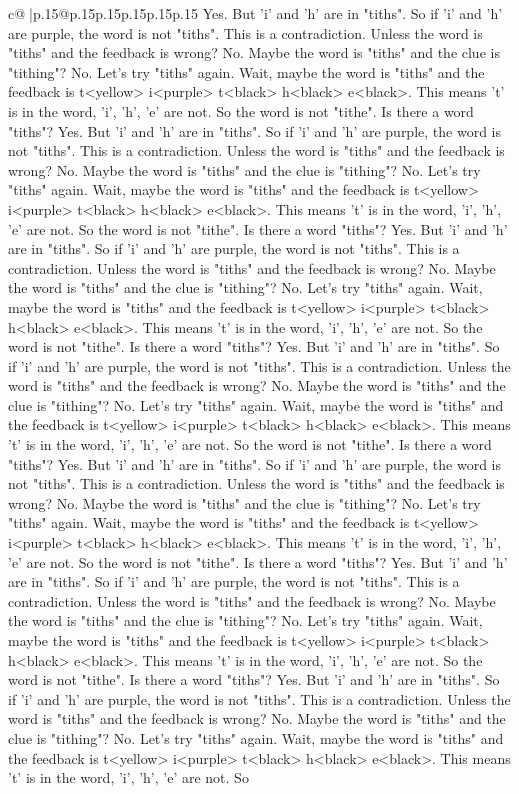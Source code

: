 \documentclass{article}
\begin{document}
{\begin{supertabular}{c@{$\;$}|p{.15\linewidth}@{}p{.15\linewidth}p{.15\linewidth}p{.15\linewidth}p{.15\linewidth}p{.15\linewidth}}
{{{Yes. But 'i' and 'h' are in "tiths". So if 'i' and 'h' are purple, the word is not "tiths". This is a contradiction. Unless the word is "tiths" and the feedback is wrong? No. Maybe the word is "tiths" and the clue is "tithing"? No. Let's try "tiths" again. Wait, maybe the word is "tiths" and the feedback is t<yellow> i<purple> t<black> h<black> e<black>. This means 't' is in the word, 'i', 'h', 'e' are not. So the word is not "tithe". Is there a word "tiths"? Yes. But 'i' and 'h' are in "tiths". So if 'i' and 'h' are purple, the word is not "tiths". This is a contradiction. Unless the word is "tiths" and the feedback is wrong? No. Maybe the word is "tiths" and the clue is "tithing"? No. Let's try "tiths" again. Wait, maybe the word is "tiths" and the feedback is t<yellow> i<purple> t<black> h<black> e<black>. This means 't' is in the word, 'i', 'h', 'e' are not. So the word is not "tithe". Is there a word "tiths"? Yes. But 'i' and 'h' are in "tiths". So if 'i' and 'h' are purple, the word is not "tiths". This is a contradiction. Unless the word is "tiths" and the feedback is wrong? No. Maybe the word is "tiths" and the clue is "tithing"? No. Let's try "tiths" again. Wait, maybe the word is "tiths" and the feedback is t<yellow> i<purple> t<black> h<black> e<black>. This means 't' is in the word, 'i', 'h', 'e' are not. So the word is not "tithe". Is there a word "tiths"? Yes. But 'i' and 'h' are in "tiths". So if 'i' and 'h' are purple, the word is not "tiths". This is a contradiction. Unless the word is "tiths" and the feedback is wrong? No. Maybe the word is "tiths" and the clue is "tithing"? No. Let's try "tiths" again. Wait, maybe the word is "tiths" and the feedback is t<yellow> i<purple> t<black> h<black> e<black>. This means 't' is in the word, 'i', 'h', 'e' are not. So the word is not "tithe". Is there a word "tiths"? Yes. But 'i' and 'h' are in "tiths". So if 'i' and 'h' are purple, the word is not "tiths". This is a contradiction. Unless the word is "tiths" and the feedback is wrong? No. Maybe the word is "tiths" and the clue is "tithing"? No. Let's try "tiths" again. Wait, maybe the word is "tiths" and the feedback is t<yellow> i<purple> t<black> h<black> e<black>. This means 't' is in the word, 'i', 'h', 'e' are not. So the word is not "tithe". Is there a word "tiths"? Yes. But 'i' and 'h' are in "tiths". So if 'i' and 'h' are purple, the word is not "tiths". This is a contradiction. Unless the word is "tiths" and the feedback is wrong? No. Maybe the word is "tiths" and the clue is "tithing"? No. Let's try "tiths" again. Wait, maybe the word is "tiths" and the feedback is t<yellow> i<purple> t<black> h<black> e<black>. This means 't' is in the word, 'i', 'h', 'e' are not. So the word is not "tithe". Is there a word "tiths"? Yes. But 'i' and 'h' are in "tiths". So if 'i' and 'h' are purple, the word is not "tiths". This is a contradiction. Unless the word is "tiths" and the feedback is wrong? No. Maybe the word is "tiths" and the clue is "tithing"? No. Let's try "tiths" again. Wait, maybe the word is "tiths" and the feedback is t<yellow> i<purple> t<black> h<black> e<black>. This means 't' is in the word, 'i', 'h', 'e' are not. So }}}
\end{supertabular}}
\end{document}
